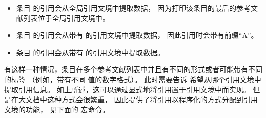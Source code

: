 \begin{itemize}
\item %
条目  的引用会从全局引用文境中提取数据，
因为打印该条目的最后的参考文献列表位于全局引用文境中。
\item %
条目  的引用会从带有  的引用文境中提取数据，
因此引用时会带有前缀“A”。
\item %
条目  的引用会从带有  的引用文境中提取数据。
\end{itemize}
%
有这样一种情况，条目在多个参考文献列表中并且有不同的形式或者可能带有不同的标签
（例如，带有不同  值的数字格式）。
此时需要告诉 \biblatex 希望从哪个引用文境中提取引用信息。
如上所述，这可以通过显式地将引用置于引用文境中而实现。
但是在大文档中这种方式会很繁重，
因此提供了将引用以程序化的方式分配到引用文境的功能，
见下面的  宏命令。

